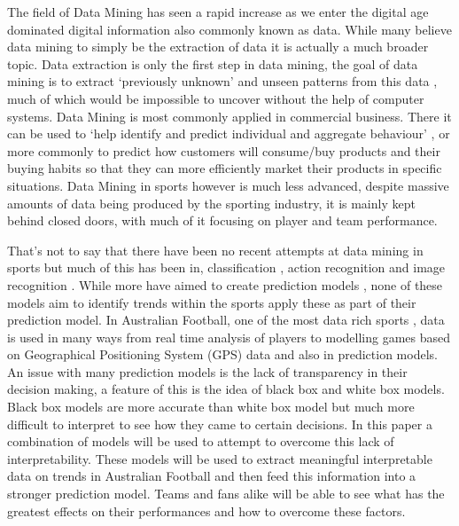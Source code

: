 \documentclass{imc-inf}
\begin{document}
	The field of Data Mining has seen a rapid increase as we enter the digital age dominated digital information also commonly known as data. While many believe data mining to simply be the extraction of data it is actually a much broader topic. Data extraction is only the first step in data mining, the goal of data mining is to extract ‘previously unknown’ and unseen patterns from this data \cite{website:TechGuy}, much of which would be impossible to uncover without the help of computer systems. Data Mining is most commonly applied in commercial business. There it can be used to ‘help identify and predict individual and aggregate behaviour’ \cite{ACM}, or more commonly to predict how customers will consume/buy products and their buying habits so that they can more efficiently market their products in specific situations. Data Mining in sports however is much less advanced, despite massive amounts of data being produced by the sporting industry, it is mainly kept behind closed doors, with much of it focusing on player and team performance.
	\linebreak
		
	That’s not to say that there have been no recent attempts at data mining in sports but much of this has been in, classification \cite{Displays}, action recognition \cite{AEJ} and image recognition \cite{Heliyon}. While more have aimed to create prediction models \cite{CollegeFootball}\cite{Basketball}\cite{LSTMPrediction}, none of these models aim to identify trends within the sports apply these as part of their prediction model. In Australian Football, one of the most data rich sports \cite{website:Vice}, data is used in many ways from real time analysis of players to modelling games based on Geographical Positioning System (GPS) data and also in prediction models. An issue with many prediction models is the lack of transparency in their decision making, a feature of this is the idea of black box and white box models. Black box models are more accurate than white box model but much more difficult to interpret to see how they came to certain decisions. In this paper a combination of models will be used to attempt to overcome this lack of interpretability. These models will be used to extract meaningful interpretable data on trends in Australian Football and then feed this information into a stronger prediction model. Teams and fans alike will be able to see what has the greatest effects on their performances and how to overcome these factors.\linebreak
	
\end{document}
